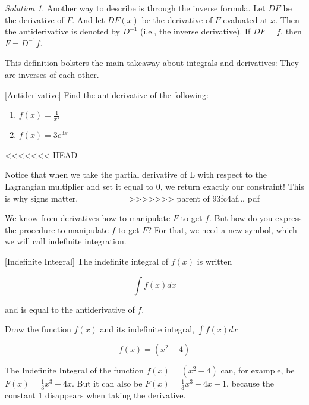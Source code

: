\documentclass[]{book}
\providecommand{\tightlist}{%
  \setlength{\itemsep}{0pt}\setlength{\parskip}{0pt}}
\theoremstyle{definition}
\theoremstyle{definition}
\theoremstyle{definition}
\theoremstyle{remark}
\newtheorem*{solution}{Solution}
\begin{document}
\begin{solution}
Another way to describe is through the inverse formula. Let \(DF\) be the derivative of \(F\). And let \(DF(x)\) be the derivative of \(F\) evaluated at \(x\). Then the antiderivative is denoted by \(D^{-1}\) (i.e., the inverse derivative). If \(DF=f\), then \(F=D^{-1}f\).

This definition bolsters the main takeaway about integrals and derivatives: They are inverses of each other.

[Antiderivative]
\protect\hypertarget{exr:unnamed-chunk-21}{}{\label{exr:unnamed-chunk-21} {} }Find the antiderivative of the following:

\begin{enumerate}
\def\labelenumi{\arabic{enumi}.}
\tightlist
\item
  \(f(x) = \frac{1}{x^2}\)
\item
  \(f(x) = 3e^{3x}\)
\end{enumerate}
<<<<<<< HEAD
\end{solution}

Notice that when we take the partial derivative of L with respect to the Lagrangian multiplier and set it equal to 0, we return exactly our constraint! This is why signs matter.
=======
>>>>>>> parent of 93fc4af... pdf

We know from derivatives how to manipulate \(F\) to get \(f\). But how do you express the procedure to manipulate \(f\) to get \(F\)? For that, we need a new symbol, which we will call indefinite integration.

[Indefinite Integral]
\protect\hypertarget{def:unnamed-chunk-22}{}{\label{def:unnamed-chunk-22} {} }The indefinite integral of \(f(x)\) is written

\[\int f(x) dx \]

and is equal to the antiderivative of \(f\).

\protect\hypertarget{exm:unnamed-chunk-23}{}{\label{exm:unnamed-chunk-23} }Draw the function \(f(x)\) and its indefinite integral, \(\int\limits f(x) dx\)

\[f(x) = (x^2-4)\]

{}The Indefinite Integral of the function \(f(x) = (x^2-4)\) can, for example, be \(F(x) = \frac{1}{3}x^3 - 4x.\) But it can also be \(F(x) = \frac{1}{3}x^3 - 4x + 1\), because the constant 1 disappears when taking the derivative.
\end{document}
